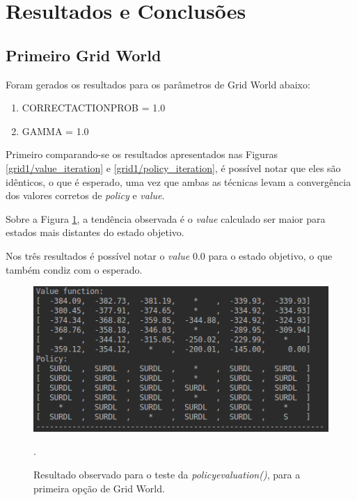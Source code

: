 \documentclass[conference]{IEEEtran}
\begin{document}
\section{Resultados e Conclusões}

\subsection{Primeiro Grid World}
Foram gerados os resultados para os parâmetros de Grid World abaixo:

\begin{enumerate}
\item CORRECT\underline{\space}ACTION\underline{\space}PROB = 1.0

\item GAMMA = 1.0
\end{enumerate}

Primeiro comparando-se os resultados apresentados nas Figuras \ref{grid1/value_iteration} e \ref{grid1/policy_iteration}, é possível notar que eles são idênticos, o que é esperado, uma vez que ambas as técnicas levam a convergência dos valores corretos de \textit{policy} e \textit{value}.

Sobre a Figura \ref{grid1/policy_evaluation}, a tendência observada é o \textit{value} calculado ser maior para estados mais distantes do estado objetivo.

Nos três resultados é possível notar o \textit{value} 0.0 para o estado objetivo, o que também condiz com o esperado. 

\begin{figure}[htbp]
\centering
\centerline{\includegraphics[scale=0.5]{imagens/grid1/policy_evaluation.png}}
\caption{Resultado observado para o teste da \textit{policy\underline{\space}evaluation()}, para a primeira opção de Grid World.}.
\label{grid1/policy_evaluation}
\end{figure}
\end{document}

